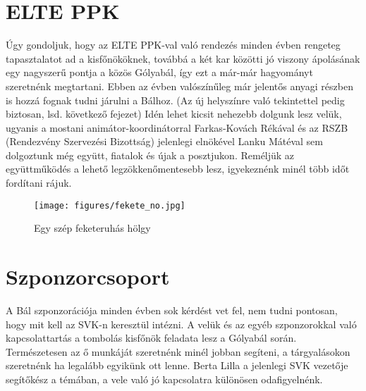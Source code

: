 \section{ELTE PPK}
\hspace{2mm} Úgy gondoljuk, hogy az ELTE PPK-val való rendezés minden évben rengeteg tapasztalatot ad a kisfőnököknek, továbbá a két kar közötti jó viszony ápolásának egy nagyszerű pontja a közös Gólyabál, így ezt a már-már hagyományt szeretnénk megtartani. Ebben az évben valószínűleg már jelentős anyagi részben is hozzá fognak tudni járulni a Bálhoz. (Az új helyszínre való tekintettel pedig biztosan, lsd. következő fejezet) Idén lehet kicsit nehezebb dolgunk lesz velük, ugyanis a mostani animátor-koordinátorral Farkas-Kovách Rékával és az RSZB (Rendezvény Szervezési Bizottság) jelenlegi elnökével Lanku Mátéval sem dolgoztunk még együtt, fiatalok és újak a posztjukon. Reméljük az együttműködés a lehető legzökkenőmentesebb lesz, igyekeznénk minél több időt fordítani rájuk.
\begin{wrapfigure}[12]{r}{0.3\textwidth} 
\begin{center}
\texttt{[image: figures/fekete\_no.jpg]}
\end{center}
\caption{Egy szép feketeruhás hölgy} 
\label{fig:FeketeNo}
\end{wrapfigure}
\section{Szponzorcsoport}
\hspace{2mm} A Bál szponzorációja minden évben sok kérdést vet fel, nem tudni pontosan, hogy mit kell az SVK-n keresztül intézni. A velük és az egyéb szponzorokkal való kapcsolattartás a tombolás kisfőnök feladata lesz a Gólyabál során. Természetesen az ő munkáját szeretnénk minél jobban segíteni, a tárgyalásokon szeretnénk ha legalább egyikünk ott lenne. Berta Lilla a jelenlegi SVK vezetője segítőkész a témában, a vele való jó kapcsolatra különösen odafigyelnénk.

